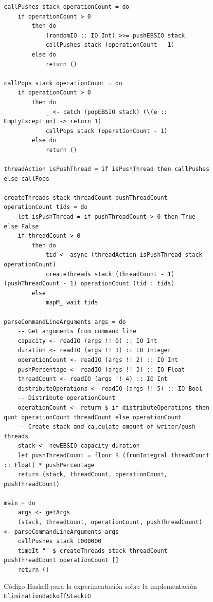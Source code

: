 \begin{figure}[H]
    \centering
    \begin{verbatim}
callPushes stack operationCount = do
    if operationCount > 0
        then do
            (randomIO :: IO Int) >>= pushEBSIO stack
            callPushes stack (operationCount - 1)
        else do
            return ()

callPops stack operationCount = do
    if operationCount > 0
        then do
            _ <- catch (popEBSIO stack) (\(e :: EmptyException) -> return 1)
            callPops stack (operationCount - 1)
        else do
            return ()

threadAction isPushThread = if isPushThread then callPushes else callPops

createThreads stack threadCount pushThreadCount operationCount tids = do
    let isPushThread = if pushThreadCount > 0 then True else False
    if threadCount > 0
        then do
            tid <- async (threadAction isPushThread stack operationCount)
            createThreads stack (threadCount - 1) (pushThreadCount - 1) operationCount (tid : tids)
        else
            mapM_ wait tids

parseCommandLineArguments args = do
    -- Get arguments from command line
    capacity <- readIO (args !! 0) :: IO Int
    duration <- readIO (args !! 1) :: IO Integer
    operationCount <- readIO (args !! 2) :: IO Int
    pushPercentage <- readIO (args !! 3) :: IO Float
    threadCount <- readIO (args !! 4) :: IO Int
    distributeOperations <- readIO (args !! 5) :: IO Bool
    -- Distribute operationCount
    operationCount <- return $ if distributeOperations then quot operationCount threadCount else operationCount
    -- Create stack and calculate amount of writer/push threads
    stack <- newEBSIO capacity duration
    let pushThreadCount = floor $ (fromIntegral threadCount :: Float) * pushPercentage
    return (stack, threadCount, operationCount, pushThreadCount)

main = do
    args <- getArgs
    (stack, threadCount, operationCount, pushThreadCount) <- parseCommandLineArguments args
    callPushes stack 1000000
    timeIt "" $ createThreads stack threadCount pushThreadCount operationCount []
    return ()
    \end{verbatim}
    \caption{Código Haskell para la experimentación sobre la implementación \texttt{EliminationBackoffStackIO}}
    \label{fig:expEBSIO}
\end{figure}

